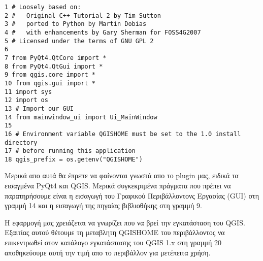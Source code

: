 \begin{verbatim}
1 # Loosely based on:
2 #   Original C++ Tutorial 2 by Tim Sutton
3 #   ported to Python by Martin Dobias
4 #   with enhancements by Gary Sherman for FOSS4G2007
5 # Licensed under the terms of GNU GPL 2
6
7 from PyQt4.QtCore import *
8 from PyQt4.QtGui import *
9 from qgis.core import *
10 from qgis.gui import *
11 import sys
12 import os
13 # Import our GUI
14 from mainwindow_ui import Ui_MainWindow
15 
16 # Environment variable QGISHOME must be set to the 1.0 install directory
17 # before running this application
18 qgis_prefix = os.getenv("QGISHOME")
\end{verbatim}

Μερικά απο αυτά θα έπρεπε να φαίνονται γνωστά απο το plugin μας, ειδικά τα εισαγμένα PyQt4 και QGIS. Μερικά συγκεκριμένα πράγματα που πρέπει να παρατηρήσουμε είναι η εισαγωγή του Γραφικού Περιβάλλοντονς Εργασίας (GUI) στη γραμμή 14 και η εισαγωγή της πηγαίας βιβλιοθήκης στη γραμμή 9.

Η εφαρμογή μας χρειάζεται να γνωρίζει που να βρεί την εγκατάσταση του QGIS. Εξαιτίας αυτού θέτουμε τη μεταβλητη QGISHOME του περιβάλλοντος να επικεντρωθεί στον κατάλογο εγκατάστασης του QGIS 1.x στη γραμμή 20 αποθηκεύουμε αυτή την τιμή απο το περιβάλλον για μετέπειτα χρήση.

